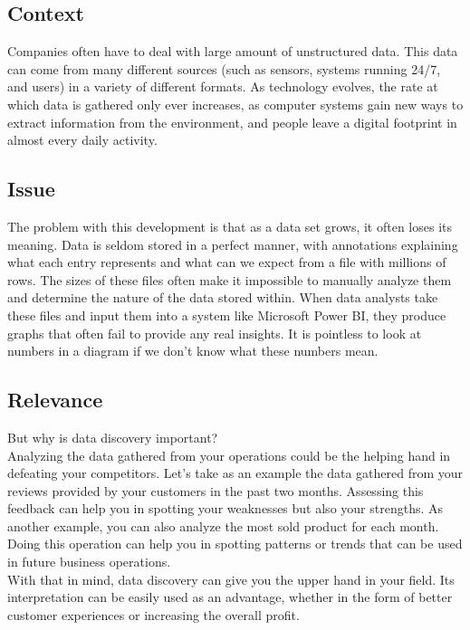 \subsection{Context}
Companies often have to deal with large amount of unstructured data.
This data can come from many different sources (such as sensors, systems running 24/7, and users) in a variety of
different formats.
As technology evolves, the rate at which data is gathered only ever increases, as computer systems gain new ways to
extract information from the environment, and people leave a digital footprint in almost every daily activity.

\subsection{Issue}
The problem with this development is that as a data set grows, it often loses its meaning.
Data is seldom stored in a perfect manner, with annotations explaining what each entry represents and what can we
expect from a file with millions of rows.
The sizes of these files often make it impossible to manually analyze them and determine the nature of the data stored within.
When data analysts take these files and input them into a system like Microsoft Power BI, they produce graphs that often fail to
provide any real insights. 
It is pointless to look at numbers in a diagram if we don't know what these numbers mean.

\subsection{Relevance}
But why is data discovery important?
\vspace{5mm} %
\\Analyzing the data gathered from your operations could be the helping hand in defeating your competitors.
Let's take as an example the data gathered from your reviews provided by your customers in the past two months.
Assessing this feedback can help you in spotting your weaknesses but also your strengths.
As another example, you can also analyze the most sold product for each month.
Doing this operation can help you in spotting patterns or trends that can be used in future business operations.
\vspace{5mm} %
\\With that in mind, data discovery can give you the upper hand in your field.
Its interpretation can be easily used as an advantage, whether in the form of better customer experiences or increasing
the overall profit.

